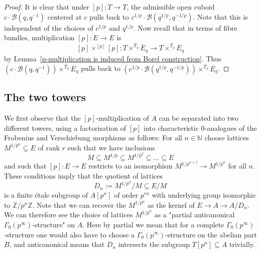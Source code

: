 \documentclass[11pt,oneside]{amsart}
\theoremstyle{definition}
\theoremstyle{remark}
\begin{document}
	\begin{proof}
		It is clear that under $[p]:T\rightarrow T$, the admissible open cuboid $c\cdot \mathcal B(q,q^{-1})$ centered at $c$ pulls back to $c^{1/p}\cdot \mathcal B(q^{1/p},q^{-1/p})$. Note that this is independent of the choices of $c^{1/p}$ and $q^{1/p}$. Now recall that in terms of fibre bundles, multiplication $[p]:E\rightarrow E$ is
		\[[p]\times^{[p]}[p]: T\times^{\overline{T}_\eta}\overline{E}_\eta\rightarrow T\times^{\overline{T}_\eta}\overline{E}_\eta \]
		by Lemma~\ref{p-multiplication is induced from Borel construction}. Thus $(c\cdot \mathcal B(q,q^{-1}))\times^{\overline{T}_\eta}\overline{E}_\eta$ pulls back to $(c^{1/p}\cdot \mathcal B(q^{1/p},q^{-1/p}))\times^{\overline{T}_\eta}\overline{E_\eta}$.
	\end{proof}

	\subsection{The two towers}
	 We first observe that
		the $[p]$-multiplication of $A$ can be separated into two different towers, using a factorisation of $[p]$ into characteristic $0$-analogues of the Frobenius and Verschiebung morphisms as follows: For all $n\in \mathbb N$ choose lattices $M^{1/p^n}\subseteq E$ of rank $r$ such that we have inclusions
		\[M\subseteq M^{1/p} \subseteq M^{1/p^2}\subseteq \dots \subseteq  E\]
		and such that  $[p]:E\rightarrow E$ restricts to an isomorphism $M^{1/p^{n+1}}\rightarrow M^{1/p^n}$ for all $n$. These conditions imply that the quotient of lattices
		\[D_n:=M^{1/p^n}/M\subseteq E/M\]
		is a finite \'etale subgroup of $A[p^n]$ of order  $p^{rn}$ with underlying group isomorphic to $\mathbb Z/p^n\mathbb Z$. Note that we can recover the $M^{1/p^n}$ as the kernel of $E\rightarrow A \rightarrow A/D_n$. We can therefore see the choice of lattices $M^{1/p^n}$ as a "partial anticanonical $\Gamma_0(p^\infty)$-structure" on $A$. Here by partial we mean that for a complete $\Gamma_0(p^\infty)$-structure one would also have to choose a $\Gamma_0(p^\infty)$-structure on the abelian part $B$, and anticanonical means that $D_n$ intersects the subgroup $T[p^n]\subseteq A$ trivially. 
		
\end{document}
